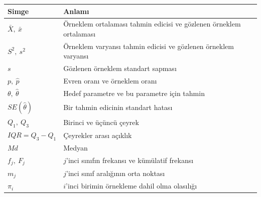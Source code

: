 \par\smallskip
\begin{center}
\begin{tabular}{@{}>{\RaggedRight\arraybackslash}p{}>{\RaggedRight\arraybackslash}p{}@{}}
\toprule
\textbf{Simge} & \textbf{Anlamı} \\
\midrule
$\bar X,\ \bar x$ & Örneklem ortalaması tahmin edicisi ve gözlenen örneklem ortalaması \\
$S^2,\ s^2$ & Örneklem varyansı tahmin edicisi ve gözlenen örneklem varyansı \\
$s$ & Gözlenen örneklem standart sapması \\
$p,\ \hat p$ & Evren oranı ve örneklem oranı \\
$\theta,\ \hat\theta$ & Hedef parametre ve bu parametre için tahmin \\
$SE(\hat\theta)$ & Bir tahmin edicinin standart hatası \\
$Q_1,\ Q_3$ & Birinci ve üçüncü çeyrek \\
$IQR=Q_3-Q_1$ & Çeyrekler arası açıklık \\
$Md$ & Medyan \\
$f_j,\ F_j$ & $j$'inci sınıfın frekansı ve kümülatif frekansı \\
$m_j$ & $j$'inci sınıf aralığının orta noktası \\
$\pi_i$ & $i$'inci birimin örnekleme dahil olma olasılığı \\
\bottomrule
\end{tabular}
\end{center}

